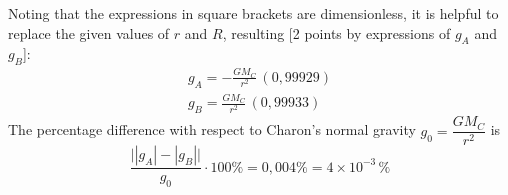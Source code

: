Noting that the expressions in square brackets are dimensionless, it is
helpful to replace the given values of $r$ and $R$, resulting [2 points by
expressions of $g_A$ and $g_B$]:
\begin{gather*}
g_A = -\frac{GM_C}{r^2}\,(0{,}99929) \\
g_B = \frac{GM_C}{r^2}\,(0{,}99933)
\end{gather*}
The percentage difference with respect to Charon's normal gravity
$g_0 = \dfrac{GM_C}{r^2}$ is
\begin{equation*}
\frac{\big||g_A| - |g_B|\big|}{g_0}\cdot 100\% = 0{,}004\%
  = 4 \times 10^{-3}\,\% \tag*{[1 point]}
\end{equation*}
